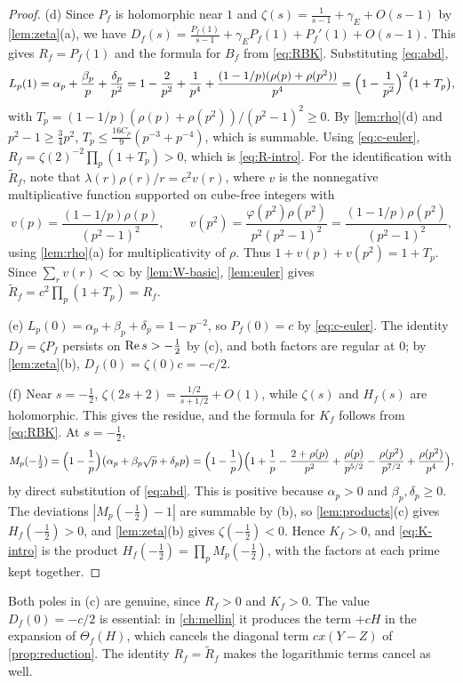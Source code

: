 \begin{proof}
(d) Since $P_f$ is holomorphic near $1$ and $\zeta(s)=\frac1{s-1}+\gamma_E+O(s-1)$ by \cref{lem:zeta}(a), we have $D_f(s)=\frac{P_f(1)}{s-1}+\gamma_EP_f(1)+P_f'(1)+O(s-1)$. This gives $R_f=P_f(1)$ and the formula for $B_f$ from \eqref{eq:RBK}. Substituting \eqref{eq:abd},
\[
L_p(1)=\alpha_p+\frac{\beta_p}p+\frac{\delta_p}{p^2}=1-\frac2{p^2}+\frac1{p^4}+\frac{(1-1/p)(\rho(p)+\rho(p^2))}{p^4}
=\Bigl(1-\frac1{p^2}\Bigr)^2\bigl(1+T_p\bigr),
\]
with $T_p=(1-1/p)(\rho(p)+\rho(p^2))/(p^2-1)^2\ge0$. By \cref{lem:rho}(d) and $p^2-1\ge\frac34p^2$, $T_p\le\frac{16C_\rho}9(p^{-3}+p^{-4})$, which is summable. Using \eqref{eq:c-euler}, $R_f=\zeta(2)^{-2}\prod_p(1+T_p)>0$, which is \eqref{eq:R-intro}. For the identification with $\widetilde R_f$, note that $\lambda(r)\rho(r)/r=c^2v(r)$, where $v$ is the nonnegative multiplicative function supported on cube-free integers with
\[
v(p)=\frac{(1-1/p)\rho(p)}{(p^2-1)^2},\qquad v(p^2)=\frac{\varphi(p^2)\rho(p^2)}{p^2(p^2-1)^2}=\frac{(1-1/p)\rho(p^2)}{(p^2-1)^2},
\]
using \cref{lem:rho}(a) for multiplicativity of $\rho$. Thus $1+v(p)+v(p^2)=1+T_p$. Since $\sum_rv(r)<\infty$ by \cref{lem:W-basic}, \cref{lem:euler} gives $\widetilde R_f=c^2\prod_p(1+T_p)=R_f$.

(e) $L_p(0)=\alpha_p+\beta_p+\delta_p=1-p^{-2}$, so $P_f(0)=c$ by \eqref{eq:c-euler}. The identity $D_f=\zeta P_f$ persists on $\operatorname{Re} s>-\frac12$ by (c), and both factors are regular at $0$; by \cref{lem:zeta}(b), $D_f(0)=\zeta(0)c=-c/2$.

(f) Near $s=-\frac12$, $\zeta(2s+2)=\frac{1/2}{s+1/2}+O(1)$, while $\zeta(s)$ and $H_f(s)$ are holomorphic. This gives the residue, and the formula for $K_f$ follows from \eqref{eq:RBK}. At $s=-\frac12$,
\[
M_p(-\tfrac12)=\Bigl(1-\frac1p\Bigr)\bigl(\alpha_p+\beta_p\sqrt p+\delta_pp\bigr)=\Bigl(1-\frac1p\Bigr)\Bigl(1+\frac1p-\frac{2+\rho(p)}{p^2}+\frac{\rho(p)}{p^{5/2}}-\frac{\rho(p^2)}{p^{7/2}}+\frac{\rho(p^2)}{p^4}\Bigr),
\]
by direct substitution of \eqref{eq:abd}. This is positive because $\alpha_p>0$ and $\beta_p,\delta_p\ge0$. The deviations $|M_p(-\frac12)-1|$ are summable by (b), so \cref{lem:products}(c) gives $H_f(-\frac12)>0$, and \cref{lem:zeta}(b) gives $\zeta(-\frac12)<0$. Hence $K_f>0$, and \eqref{eq:K-intro} is the product $H_f(-\frac12)=\prod_pM_p(-\frac12)$, with the factors at each prime kept together.
\end{proof}

\begin{remark}
Both poles in (c) are genuine, since $R_f>0$ and $K_f>0$. The value $D_f(0)=-c/2$ is essential: in \cref{ch:mellin} it produces the term $+cH$ in the expansion of $\Theta_f(H)$, which cancels the diagonal term $cx(Y-Z)$ of \cref{prop:reduction}. The identity $R_f=\widetilde R_f$ makes the logarithmic terms cancel as well.
\end{remark}
